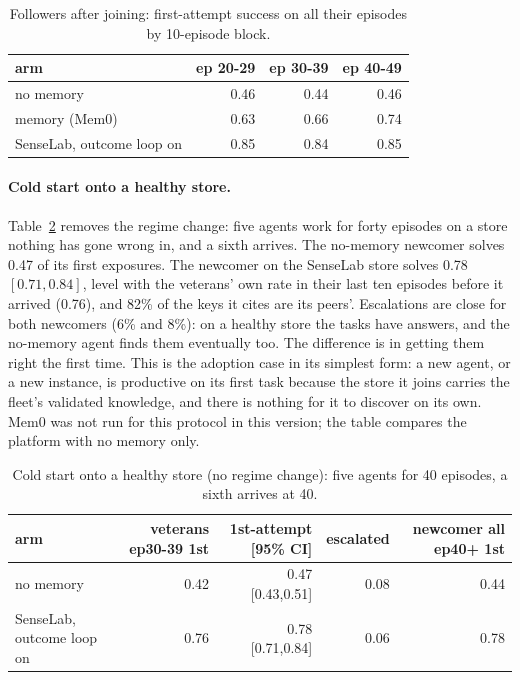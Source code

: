 \documentclass[11pt]{article}
\begin{document}
\begin{table}[H]
\centering\scriptsize
\begin{tabular}{lrrr}
\toprule
\textbf{arm} & \textbf{ep 20-29} & \textbf{ep 30-39} & \textbf{ep 40-49} \\
\midrule
no memory & 0.46 & 0.44 & 0.46 \\
memory (Mem0) & 0.63 & 0.66 & 0.74 \\
SenseLab, outcome loop on & 0.85 & 0.84 & 0.85 \\
\bottomrule
\end{tabular}
\caption{Followers after joining: first-attempt success on all their episodes by 10-episode block.}
\label{tab:pioneerblocks}
\end{table}


\paragraph{Cold start onto a healthy store.} Table~\ref{tab:cold} removes the regime change:
five agents work for forty episodes on a store nothing has gone wrong in, and a sixth arrives.
The no-memory newcomer solves 0.47 of its first exposures. The newcomer on the
SenseLab store solves 0.78 $[0.71, 0.84]$, level with the veterans' own rate in
their last ten episodes before it arrived (0.76), and 82\% of the keys it cites are its
peers'. Escalations are close for both newcomers (6\% and 8\%): on a healthy store the
tasks have answers, and the no-memory agent finds them eventually too. The difference is in
getting them right the first time. This is the adoption case in its simplest form: a new agent,
or a new instance, is productive on its first task because the store it joins carries the
fleet's validated knowledge, and there is nothing for it to discover on its own. Mem0 was not
run for this protocol in this version; the table compares the platform with no memory only.

\begin{table}[H]
\centering\scriptsize
\begin{tabular}{lrrrr}
\toprule
\textbf{arm} & \textbf{veterans ep30-39 1st} & \textbf{1st-attempt [95\% CI]} & \textbf{escalated} & \textbf{newcomer all ep40+ 1st} \\
\midrule
no memory & 0.42 & 0.47 [0.43,0.51] & 0.08 & 0.44 \\
SenseLab, outcome loop on & 0.76 & 0.78 [0.71,0.84] & 0.06 & 0.78 \\
\bottomrule
\end{tabular}
\caption{Cold start onto a healthy store (no regime change): five agents for 40 episodes, a sixth arrives at 40.}
\label{tab:cold}
\end{table}
\end{document}

